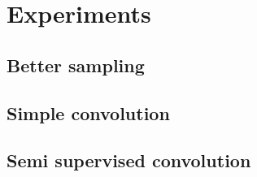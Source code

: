 \section{Experiments}\label{section:experiments}

\subsection{Better sampling} %
\label{sub:better_sampling}


\subsection{Simple convolution} %
\label{sub:simple_convolution}


\subsection{Semi supervised convolution} %
\label{sub:semi_supervised_convolution}

